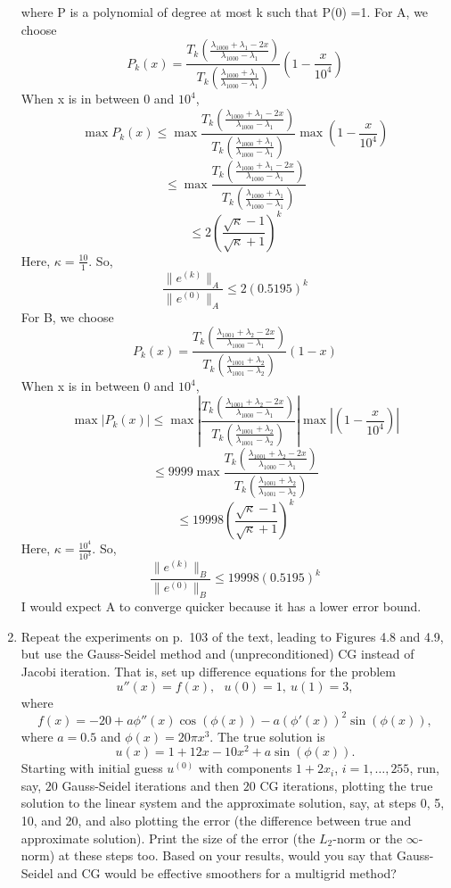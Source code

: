 \documentclass[letterpaper,12pt]{article}
\begin{document}
\begin{enumerate}
where P is a polynomial of degree at most k such that P(0) =1.
For A, we choose
\[P_k(x) = \frac{T_k(\frac{\lambda_{1000} + \lambda_1-2x}{\lambda_{1000} - \lambda_1})}{T_k(\frac{\lambda_{1000} + \lambda_1}{\lambda_{1000} - \lambda_1})} (1-\frac{x}{10^4})\]
When x is in between 0 and $10^4$,
\[\max P_k(x) \leq \max \frac{T_k(\frac{\lambda_{1000} + \lambda_1-2x}{\lambda_{1000} - \lambda_1})}{T_k(\frac{\lambda_{1000} + \lambda_1}{\lambda_{1000} - \lambda_1})} \max(1-\frac{x}{10^4})\]
\[\leq \max \frac{T_k(\frac{\lambda_{1000} + \lambda_1-2x}{\lambda_{1000} - \lambda_1})}{T_k(\frac{\lambda_{1000} + \lambda_1}{\lambda_{1000} - \lambda_1})}\]
\[\leq 2 \left( \frac{
\sqrt{\kappa} - 1}{\sqrt{\kappa} +1} \right)^k \]
Here, $\kappa = \frac{10}{1}$. So,
\[
\frac{\| e^{(k)} \|_{A}}{\| e^{(0)} \|_{A}} \leq 2(0.5195)^k
\]
For B, we choose
\[P_k(x) = \frac{T_k(\frac{\lambda_{1001} + \lambda_2-2x}{\lambda_{1000} - \lambda_1})}{T_k(\frac{\lambda_{1001} + \lambda_2}{\lambda_{1001} - \lambda_2})} (1-x)\]
When x is in between 0 and $10^4$,
\[\max |P_k(x)| \leq \max |\frac{T_k(\frac{\lambda_{1001} + \lambda_2-2x}{\lambda_{1000} - \lambda_1})}{T_k(\frac{\lambda_{1001} + \lambda_2}{\lambda_{1001} - \lambda_2})}| \max|(1-\frac{x}{10^4})|\]
\[\leq 9999 \max \frac{T_k(\frac{\lambda_{1001} + \lambda_2-2x}{\lambda_{1000} - \lambda_1})}{T_k(\frac{\lambda_{1001} + \lambda_2}{\lambda_{1001} - \lambda_2})}\]
\[\leq 19998 \left( \frac{
\sqrt{\kappa} - 1}{\sqrt{\kappa} +1} \right)^k \]
Here, $\kappa = \frac{10^4}{10^3}$. So,
\[
\frac{\| e^{(k)} \|_{B}}{\| e^{(0)} \|_{B}} \leq 19998(0.5195)^k
\]
I would expect A to converge quicker because it has a lower error bound.
\item
Repeat the experiments on p.~103 of the text, leading to Figures 4.8 and
4.9, but use the Gauss-Seidel method and (unpreconditioned) CG instead of 
Jacobi iteration.  
That is, set up difference equations for the problem
\[
u''(x) = f(x),~~~u(0) = 1 ,~u(1) = 3 ,
\]
where
\[
f(x) = -20 + a \phi'' (x) \cos( \phi (x)) - a ( \phi' (x) )^2 \sin ( \phi (x) ),
\]
where $a = 0.5$ and $\phi (x) = 20 \pi x^3$.  The true solution is
\[
u(x) = 1 + 12 x - 10 x^2 + a \sin ( \phi (x) ) .
\]
Starting with initial guess $u^{(0)}$ with components $1 + 2 x_i$, 
$i=1, \ldots , 255$, run, say, $20$ Gauss-Seidel iterations and then
$20$ CG iterations, plotting the true solution to the linear system 
and the approximate solution, say, at steps 0, 5, 10, and 20, and 
also plotting the error (the difference between true and approximate 
solution).  Print the size of the error (the $L_2$-norm or the $\infty$-norm) 
at these steps too.  Based on your results, would you say that Gauss-Seidel 
and CG would be effective smoothers for a multigrid method?



\end{enumerate}
\end{document}
